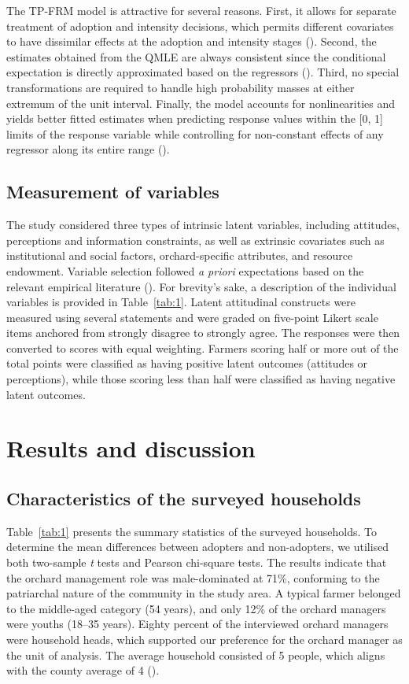 \documentclass[fleqn,twoside,reqno]{article}
\begin{document}
The TP-FRM model is attractive for several reasons. First, it allows for separate treatment of adoption and intensity decisions, which permits different covariates to have dissimilar effects at the adoption and intensity stages (\cite{Ramalho2009}). Second, the estimates obtained from the QMLE are always consistent since the conditional expectation is directly approximated based on the regressors (\cite{Papke1996}). Third, no special transformations are required to handle high probability masses at either extremum of the unit interval. Finally, the model accounts for nonlinearities and yields better fitted estimates when predicting response values within the [0, 1] limits of the response variable while controlling for non-constant effects of any regressor along its entire range (\cite{Papke1996}).

\subsection{Measurement of variables}
The study considered three types of intrinsic latent variables, including attitudes, perceptions and information constraints, as well as extrinsic covariates such as institutional and social factors, orchard-specific attributes, and resource endowment. Variable selection followed \textit{a priori} expectations based on the relevant empirical literature (\cite{Despotovic2019, Kabir2022, Midingoyi2019, Misango2022, Muriithi2021, Mwungu2020, Nyangau2022, Otieno2023, Sadique2022, Wangithi2021, Zeweld2017}). For brevity’s sake, a description of the individual variables is provided in Table~\ref{tab:1}. Latent attitudinal constructs were measured using several statements and were graded on five-point Likert scale items anchored from strongly disagree to strongly agree. The responses were then converted to scores with equal weighting. Farmers scoring half or more out of the total points were classified as having positive latent outcomes (attitudes or perceptions), while those scoring less than half were classified as having negative latent outcomes.

\section{Results and discussion}\label{sec:3} 
\subsection{Characteristics of the surveyed households}
Table~\ref{tab:1} presents the summary statistics of the surveyed households. To determine the mean differences between adopters and non-adopters, we utilised both two-sample \textit{t} tests and Pearson chi-square tests. The results indicate that the orchard management role was male-dominated at 71\%, conforming to the patriarchal nature of the community in the study area. A typical farmer belonged to the middle-aged category (54 years), and only 12\% of the orchard managers were youths (18--35 years). Eighty percent of the interviewed orchard managers were household heads, which supported our preference for the orchard manager as the unit of analysis. The average household consisted of 5 people, which aligns with the county average of 4 (\cite{County2022}).
\end{document}
